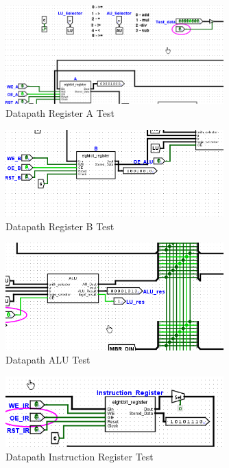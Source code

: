 \documentclass[12pt letter]{report}
\begin{document}
\begin{figure}[H]
  \centering
  \includegraphics[width=0.75\textwidth]{dp_A.png}
  \caption{Datapath Register A Test}
\end{figure}

\begin{figure}[H]
  \centering
  \includegraphics[width=0.75\textwidth]{dp_B.png}
  \caption{Datapath Register B Test}
\end{figure}

\begin{figure}[H]
  \centering
  \includegraphics[width=0.75\textwidth]{dp_alu.png}
  \caption{Datapath ALU Test}
\end{figure}

\begin{figure}[H]
  \centering
  \includegraphics[width=0.75\textwidth]{dp_ir.png}
  \caption{Datapath Instruction Register Test}
\end{figure}
\end{document}

